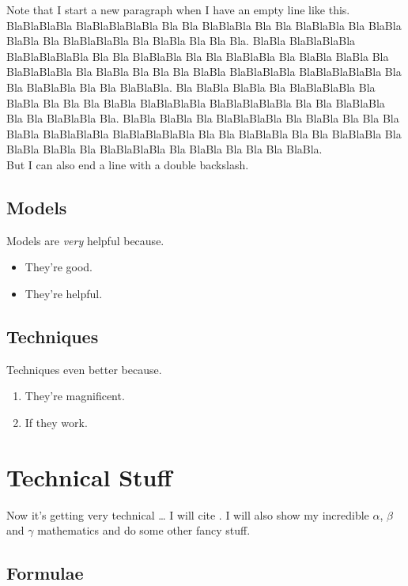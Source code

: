 \documentclass[11pt,twoside]{article}
\numberwithin{Theorem}{section}
\numberwithin{Definition}{section}
\numberwithin{Lemma}{section}
\numberwithin{Algorithm}{section}
\numberwithin{equation}{section}
\begin{document}
Note that I start a new paragraph when I have an empty line like this. BlaBlaBlaBla BlaBlaBlaBlaBla Bla Bla BlaBlaBla Bla Bla BlaBlaBla Bla BlaBla BlaBla Bla BlaBlaBlaBla Bla BlaBla Bla Bla Bla. BlaBla BlaBlaBlaBla BlaBlaBlaBlaBla Bla Bla BlaBlaBla Bla Bla BlaBlaBla Bla BlaBla BlaBla Bla BlaBlaBlaBla Bla BlaBla Bla Bla Bla BlaBla BlaBlaBlaBla BlaBlaBlaBlaBla Bla Bla BlaBlaBla Bla Bla BlaBlaBla. Bla BlaBla BlaBla Bla BlaBlaBlaBla Bla BlaBla Bla Bla Bla BlaBla BlaBlaBlaBla BlaBlaBlaBlaBla Bla Bla BlaBlaBla Bla Bla BlaBlaBla Bla. BlaBla BlaBla Bla BlaBlaBlaBla Bla BlaBla Bla Bla Bla BlaBla BlaBlaBlaBla BlaBlaBlaBlaBla Bla Bla BlaBlaBla Bla Bla BlaBlaBla Bla BlaBla BlaBla Bla BlaBlaBlaBla Bla BlaBla Bla Bla Bla BlaBla.\\
But I can also end a line with a double backslash.
\clearpage

\subsection{Models}
\label{sec:Models}

Models are \emph{very} helpful because.
\begin{itemize}
 \item They're good.
 \item They're helpful.
\end{itemize}
\clearpage

\subsection{Techniques}
\label{sec:Techniques}

Techniques even better because.
\begin{enumerate}
 \item They're magnificent.
 \item If they work.
\end{enumerate}
\clearpage

\section{Technical Stuff}

Now it's getting very technical \ldots{} I will cite \cite{shiina,groewe2001}. I will also show my incredible $\alpha$, $\beta$ and $\gamma$ mathematics and do some other fancy stuff.

\subsection{Formulae}
\end{document}
